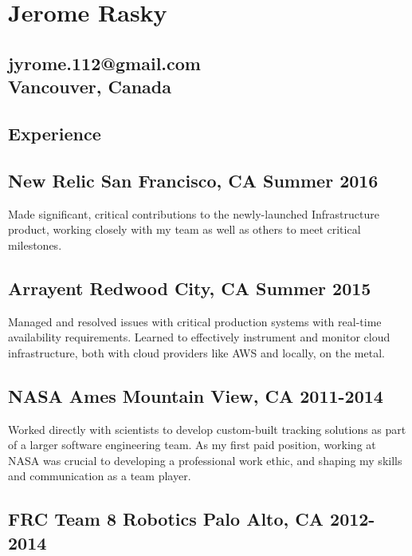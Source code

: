 \documentclass[letterpaper]{article}
\newcommand{\subtitle}{\normalfont\sffamily\color{black}\large}
\begin{document}
\sffamily
\large
{}

\section*{\Huge Jerome Rasky}
\subsection*{jyrome.112@gmail.com \\\subtitle Vancouver, Canada}

\vspace{.4in}

\begin{multicols}{2}
\section*{Experience}
\subsection*{New Relic \subtitle San Francisco, CA Summer 2016}

Made significant, critical contributions to the newly-launched Infrastructure
product, working closely with my team as well as others to meet critical milestones.

\subsection*{Arrayent \subtitle Redwood City, CA Summer 2015}

Managed and resolved issues with critical production systems with real-time
availability requirements. Learned to effectively instrument and monitor cloud
infrastructure, both with cloud providers like AWS and locally, on the metal.

\subsection*{NASA Ames \subtitle Mountain View, CA 2011-2014}

Worked directly with scientists to develop custom-built tracking solutions as
part of a larger software engineering team. As my first paid position, working
at NASA was crucial to developing a professional work ethic, and shaping my
skills and communication as a team player.

\subsection*{FRC Team 8 Robotics \subtitle Palo Alto, CA 2012-2014}


\end{multicols}
\end{document}
